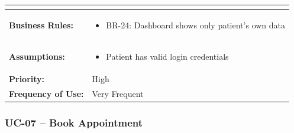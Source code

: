 \documentclass[12pt,a4paper]{article}
\begin{document}
\begin{longtable}{|p{4.5cm}|p{10.5cm}|}
\begin{itemize}
\end{itemize} \\
\hline
\textbf{Business Rules:} &
\begin{itemize}
  \item BR-24: Dashboard shows only patient's own data
\end{itemize} \\
\hline
\textbf{Assumptions:} &
\begin{itemize}
  \item Patient has valid login credentials
\end{itemize} \\
\hline
\textbf{Priority:} & High \\
\hline
\textbf{Frequency of Use:} & Very Frequent \\
\hline
\end{longtable}

\subsubsection{UC-07 – Book Appointment}
\end{document}
